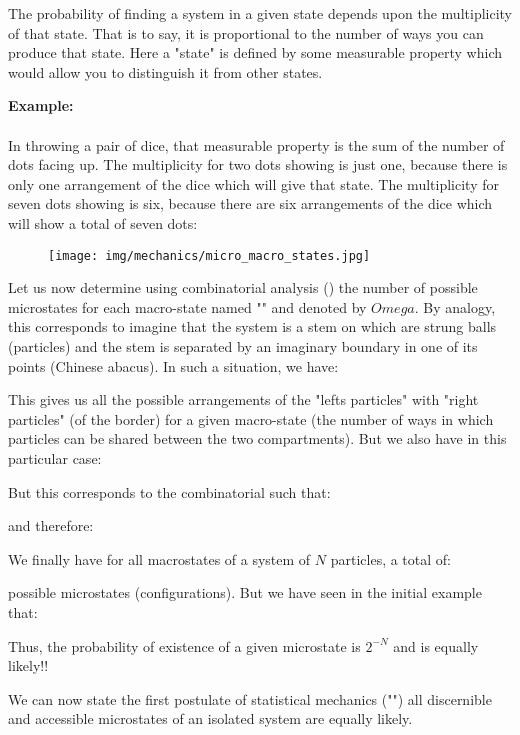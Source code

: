 	The probability of finding a system in a given state depends upon the multiplicity of that state. That is to say, it is proportional to the number of ways you can produce that state. Here a "state" is defined by some measurable property which would allow you to distinguish it from other states. 
	\begin{tcolorbox}[colframe=black,colback=white,sharp corners]
	\textbf{{\Large {}}Example:}\\\\
	In throwing a pair of dice, that measurable property is the sum of the number of dots facing up. The multiplicity for two dots showing is just one, because there is only one arrangement of the dice which will give that state. The multiplicity for seven dots showing is six, because there are six arrangements of the dice which will show a total of seven dots:
	\begin{figure}[H]
		\centering
		\texttt{[image: img/mechanics/micro\_macro\_states.jpg]}
	\end{figure}
	\end{tcolorbox}
	Let us now determine using combinatorial analysis () the number of possible microstates for each macro-state named "" and denoted by $Omega$. By analogy, this corresponds to imagine that the system is a stem on which are strung balls (particles) and the stem is separated by an imaginary boundary in one of its points (Chinese abacus). In such a situation, we have:
	
	This gives us all the possible arrangements of the "lefts particles" with "right particles" (of the border) for a given macro-state (the number of ways in which particles can be shared between the two compartments). But we also have in this particular case:
	
	But this corresponds to the combinatorial such that:
	
	and therefore:
	
	We finally have for all macrostates of a system of $N$ particles, a total of:
	
	possible microstates (configurations). But we have seen in the initial example that:
	
	Thus, the probability of existence of a given microstate is $2^{-N}$ and is equally likely!!
	
	We can now state the first postulate of statistical mechanics ("") all discernible and accessible microstates of an isolated system are equally likely.
	
